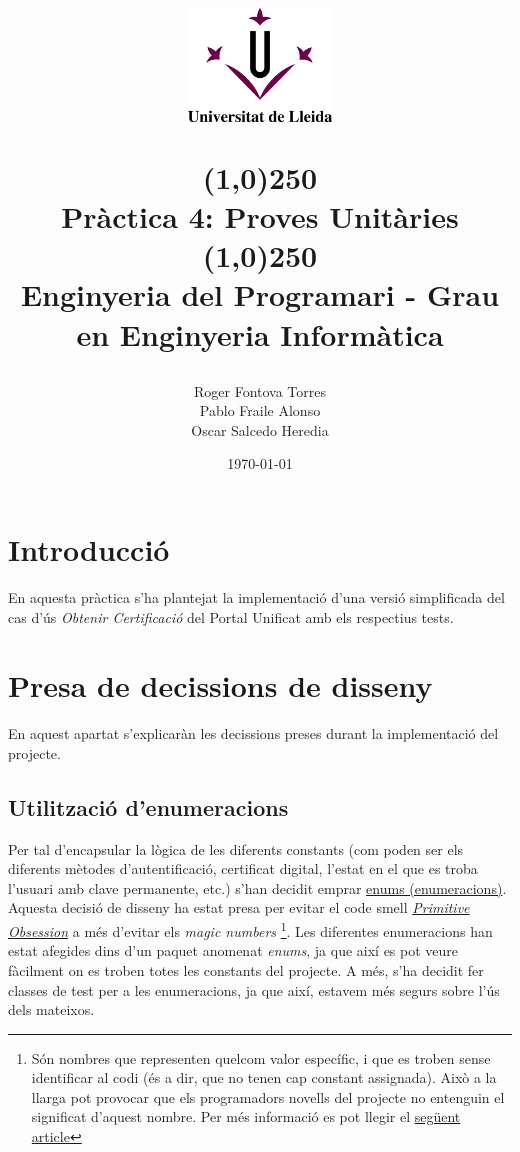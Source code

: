 \documentclass[12pt, letterpaper]{article}
\title{%
    \begin{center}
	\includegraphics[width=4cm,height=3cm]{udl.png}
    \end{center}
    \line(1,0){250}\\[0.3cm]
    \textbf{Pràctica 4: Proves Unitàries}
    \line(1,0){250}
    \\[0.5cm]
	\large Enginyeria del Programari - Grau en Enginyeria Informàtica
}
\author{Roger Fontova Torres \\ Pablo Fraile Alonso \\ Oscar Salcedo Heredia}
\date{\today}
\begin{document}
    
\maketitle
\thispagestyle{empty}
\newpage
\tableofcontents
\newpage


\section{Introducció}
\label{introduction}
En aquesta pràctica s'ha plantejat la implementació d'una versió simplificada del cas d'ús  \textit{Obtenir Certificació} del Portal Unificat amb els respectius tests. \\

\section{Presa de decissions de disseny}
\label{decissisions}
En aquest apartat s'explicaràn les decissions preses durant la implementació del projecte.

\subsection{Utilització d'enumeracions}
\label{enumeracions}
Per tal d'encapsular la lògica de les diferents constants (com poden ser els diferents mètodes d'autentificació, certificat digital, l'estat en el que es troba l'usuari amb clave permanente, etc.) s'han decidit emprar \href{https://docs.oracle.com/javase/tutorial/java/javaOO/enum.html}{enums (enumeracions)}.\\

Aquesta decisió de disseny ha estat presa per evitar el code smell \href{https://refactoring.guru/smells/primitive-obsession}{\textit{Primitive Obsession}} a més d'evitar els \textit{magic numbers} \footnote{Són nombres que representen quelcom valor específic, i que es troben sense identificar al codi (és a dir, que no tenen cap constant assignada). Això a la llarga pot provocar que els programadors novells del projecte no entenguin el significat d'aquest nombre. Per més informació es pot llegir el \href{https://en.wikipedia.org/wiki/Magic_number_(programming)}{següent article}}. Les diferentes enumeracions han estat afegides dins d'un paquet anomenat \textit{enums}, ja que així es pot veure fàcilment on es troben totes les constants del projecte. A més, s'ha decidit fer classes de test per a les enumeracions, ja que així, estavem més segurs sobre l'ús dels mateixos.
\end{document}
